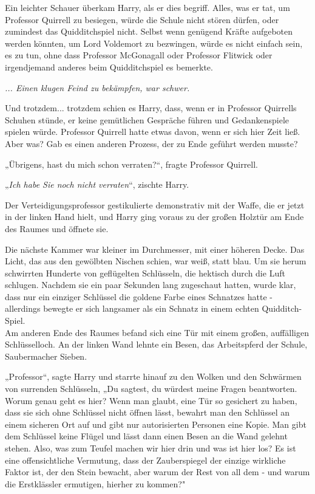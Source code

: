 {Ein leichter Schauer überkam Harry, als er dies begriff. Alles, was er tat, um Professor Quirrell zu besiegen, würde die Schule nicht stören dürfen, oder zumindest das Quidditchspiel nicht. Selbst wenn genügend Kräfte aufgeboten werden könnten, um Lord Voldemort zu bezwingen, würde es nicht einfach sein, es zu tun, ohne dass Professor McGonagall oder Professor Flitwick oder irgendjemand anderes beim Quidditchspiel es bemerkte.

\emph{... Einen klugen Feind zu bekämpfen, war schwer.}

Und trotzdem... trotzdem schien es Harry, dass, wenn er in Professor Quirrells Schuhen stünde, er keine gemütlichen Gespräche führen und Gedankenspiele spielen würde. Professor Quirrell hatte etwas davon, wenn er sich hier Zeit ließ. Aber was? Gab es einen anderen Prozess, der zu Ende geführt werden musste?

„Übrigens, hast du mich schon verraten?“, fragte Professor Quirrell.

„\emph{Ich habe Sie noch nicht verraten}“, zischte Harry.

Der Verteidigungsprofessor gestikulierte demonstrativ mit der Waffe, die er jetzt in der linken Hand hielt, und Harry ging voraus zu der großen Holztür am Ende des Raumes und öffnete sie.

Die nächste Kammer war kleiner im Durchmesser, mit einer höheren Decke. Das Licht, das aus den gewölbten Nischen schien, war weiß, statt blau. Um sie herum schwirrten Hunderte von geflügelten Schlüsseln, die hektisch durch die Luft schlugen. Nachdem sie ein paar Sekunden lang zugeschaut hatten, wurde klar, dass nur ein einziger Schlüssel die goldene Farbe eines Schnatzes hatte - allerdings bewegte er sich langsamer als ein Schnatz in einem echten Quidditch-Spiel.\\ Am anderen Ende des Raumes befand sich eine Tür mit einem großen, auffälligen Schlüsselloch. An der linken Wand lehnte ein Besen, das Arbeitspferd der Schule, Saubermacher Sieben.

„Professor“, sagte Harry und starrte hinauf zu den Wolken und den Schwärmen von surrenden Schlüsseln, „Du sagtest, du würdest meine Fragen beantworten. Worum genau geht es hier? Wenn man glaubt, eine Tür so gesichert zu haben, dass sie sich ohne Schlüssel nicht öffnen lässt, bewahrt man den Schlüssel an einem sicheren Ort auf und gibt nur autorisierten Personen eine Kopie. Man gibt dem Schlüssel keine Flügel und lässt dann einen Besen an die Wand gelehnt stehen. Also, was zum Teufel machen wir hier drin und was ist hier los? Es ist eine offensichtliche Vermutung, dass der Zauberspiegel der einzige wirkliche Faktor ist, der den Stein bewacht, aber warum der Rest von all dem - und warum die Erstklässler ermutigen, hierher zu kommen?"

}

